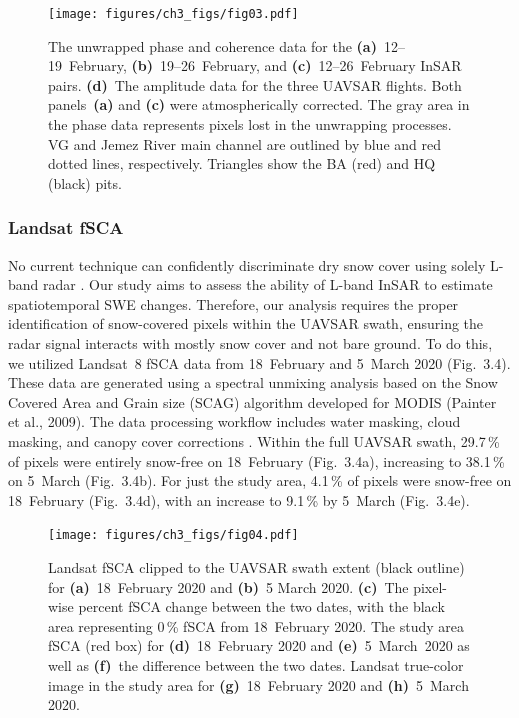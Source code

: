 \begin{figure}[t]
\centering
\texttt{[image: figures/ch3\_figs/fig03.pdf]}
\caption{The unwrapped phase and coherence data for the \textbf{(a)}~12--19~February, \textbf{(b)}~19--26~February, and \textbf{(c)}~12--26~February InSAR pairs. \textbf{(d)}~The amplitude data for the three UAVSAR flights. Both panels~\textbf{(a)} and \textbf{(c)} were atmospherically corrected. The gray area in the phase data represents pixels lost in the unwrapping processes. VG and Jemez River main channel are outlined by blue and red dotted lines, respectively. Triangles show the BA (red) and HQ (black) pits.}
\end{figure}
\clearpage


\hypertarget{ch3-methods-6}{\subsubsection{Landsat fSCA}\label{ch3-methods-6}}


No current technique can confidently discriminate dry snow cover using solely L-band radar \citep{tsaiRemoteSensingSnow2019}. Our study aims to assess the ability of L-band InSAR to estimate spatiotemporal SWE changes. Therefore, our analysis requires the proper identification of snow-covered pixels within the UAVSAR swath, ensuring the radar signal interacts with mostly snow cover and not bare ground. To do this, we utilized Landsat~8 fSCA \citep{u.s.geologicalsurveyearthresourcesobservationandsciencecenterCollection1LandsatLevel32018} data from 18~February and 5~March 2020 (Fig.~3.4). These data are generated using a spectral unmixing analysis based on the Snow Covered Area and Grain size (SCAG) algorithm developed for MODIS (Painter et al., 2009). The data processing workflow includes water masking, cloud masking, and canopy cover corrections \citep{selkowitzUSGSLandsatSnow2017, stillingerLandsatMODISVIIRS2023a}. Within the full UAVSAR swath, 29.7\,\% of pixels were entirely snow-free on 18~February (Fig.~3.4a), increasing to 38.1\,\% on 5~March (Fig.~3.4b). For just the study area, 4.1\,\% of pixels were snow-free on 18~February (Fig.~3.4d), with an increase to 9.1\,\% by 5~March (Fig.~3.4e).

\begin{figure}[t]
\texttt{[image: figures/ch3\_figs/fig04.pdf]}
\caption{Landsat fSCA clipped to the UAVSAR swath extent (black outline) for \textbf{(a)}~18~February 2020 and \textbf{(b)}~5 March 2020. \textbf{(c)}~The pixel-wise percent fSCA change between the two dates, with the black area representing 0\,\% fSCA from 18~February 2020. The study area fSCA (red box) for \textbf{(d)}~18~February 2020 and \textbf{(e)}~5~March~2020 as well as \textbf{(f)}~the difference between the two dates. Landsat true-color image in the study area for \textbf{(g)}~18~February 2020 and \textbf{(h)}~5~March 2020.}
\end{figure}

